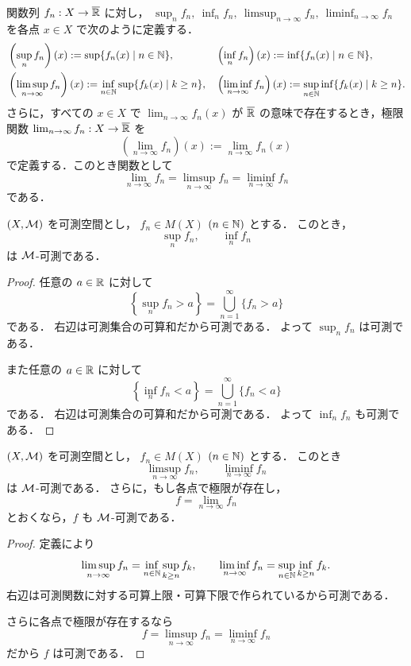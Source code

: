 \begin{definition}\label{def:pointwise-limits}
関数列 $f_n:X\to\overline{\mathbb R}$ に対し，
$\sup_n f_n,\ \inf_n f_n,\ \limsup_{n\to\infty}f_n,\ \liminf_{n\to\infty}f_n$
を各点 $x\in X$ で次のように定義する．
\begin{align*}
&\left(\sup_{n}f_n\right)(x)
:= \sup \{f_n(x) \mid n \in \mathbb N \},
&&\left(\inf_{n}f_n\right)(x)
:= \inf \{f_n(x) \mid n \in \mathbb N \},\\
&\left(\limsup_{n \to \infty} f_n\right)(x)
:= \inf_{n\in\mathbb N}\sup\{f_k(x)\mid k\ge n\},
&&\left(\liminf_{n \to \infty} f_n\right)(x)
:= \sup_{n\in\mathbb N}\inf\{f_k(x)\mid k\ge n\}.
\end{align*}
さらに，すべての $x\in X$ で $\lim_{n\to\infty}f_n(x)$ が
$\overline{\mathbb R}$ の意味で存在するとき，極限関数 $\lim_{n\to\infty}f_n:X\to\overline{\mathbb R}$ を
\[
\left(\lim_{n\to\infty}f_n\right)(x)
:=\lim_{n\to\infty}f_n(x)
\]
で定義する．このとき関数として
\[
\lim_{n\to\infty}f_n
=\limsup_{n\to\infty}f_n
=\liminf_{n\to\infty}f_n
\]
である．
\end{definition}

\begin{proposition}\label{prop:measurable-countable-sup-inf}
$(X,\mathcal M)$ を可測空間とし，
$f_n\in M(X)$ $(n\in\mathbb N)$ とする．
このとき，
\[
\sup_{n}f_n,
\qquad
\inf_{n}f_n
\]
は $\mathcal M$-可測である．
\end{proposition}
\begin{proof}
任意の $a\in\mathbb R$ に対して
\[
\left\{\sup_n f_n>a\right\}
=
\bigcup_{n=1}^{\infty}\{f_n>a\}
\]
である．
右辺は可測集合の可算和だから可測である．
よって $\sup_n f_n$ は可測である．

また任意の $a\in\mathbb R$ に対して
\[
\left\{\inf_n f_n<a\right\}
=
\bigcup_{n=1}^{\infty}\{f_n<a\}
\]
である．
右辺は可測集合の可算和だから可測である．
よって $\inf_n f_n$ も可測である．
\end{proof}

\begin{proposition}\label{prop:measurable-limsup-liminf}
$(X,\mathcal M)$ を可測空間とし，
$f_n\in M(X)$ $(n\in\mathbb N)$ とする．
このとき
\[
\limsup_{n\to\infty}f_n,\qquad
\liminf_{n\to\infty}f_n
\]
は $\mathcal M$-可測である．
さらに，もし各点で極限が存在し，
\[
f=\lim_{n\to\infty}f_n
\]
とおくなら，$f$ も $\mathcal M$-可測である．
\end{proposition}
\begin{proof}
定義により
\[
\limsup_{n\to\infty}f_n
=
\inf_{n\in\mathbb N}\sup_{k\ge n}f_k,
\qquad
\liminf_{n\to\infty}f_n
=
\sup_{n\in\mathbb N}\inf_{k\ge n}f_k.
\]
右辺は可測関数に対する可算上限・可算下限で作られているから可測である．

さらに各点で極限が存在するなら
\[
f=\limsup_{n\to\infty}f_n=\liminf_{n\to\infty}f_n
\]
だから $f$ は可測である．
\end{proof}

